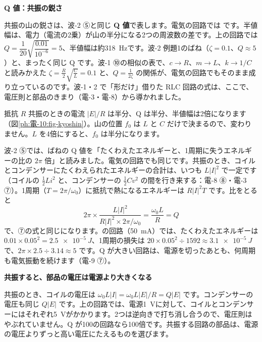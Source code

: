 \noindent\textbf{Q 値：共振の鋭さ}\par\nobreak
共振の山の鋭さは、波-2 ⑤と同じ \textbf{Q 値}で表します。電気の回路では
\label{ph:電-10:q}です。半値幅は、電力（電流の2乗）が山の半分になる2つの周波数の差です。上の回路では $Q=\dfrac{1}{20}\sqrt{\dfrac{0.01}{10^{-6}}}=5$、半値幅は約\qty{318}{Hz}です。波-2 例題1のばね（$\zeta=0.1$、$Q\approx5$）と、まったく同じ Q です。波-1 ⑩の相似の表で、$c\to R$、$m\to L$、$k\to1/C$ と読みかえた $\zeta=\tfrac{R}{2}\sqrt{\tfrac{C}{L}}=0.1$ と、$Q=\tfrac{1}{2\zeta}$ の関係が、電気の回路でもそのまま成り立っているのです。波-1・2 で「形だけ」借りた RLC 回路の式は、ここで、電圧則と部品のきまり（電-3・電-8）から導かれました。

\begin{phbaisuru}{抵抗 $R$}
共振のときの電流 $\lvert E\rvert/R$ は半分、Q は半分、半値幅は2倍になります（図\ref{ph:電-10:fig-kyoshin}）。山の位置 $f_0$ は $L$ と $C$ だけで決まるので、変わりません。$L$ を4倍にすると、$f_0$ は半分になります。
\end{phbaisuru}

\begin{motto}[4]
波-2 ⑤では、ばねの Q 値を「たくわえたエネルギーと、1周期に失うエネルギーの比の $2\pi$ 倍」と読みました。電気の回路でも同じです。共振のとき、コイルとコンデンサーにたくわえられたエネルギーの合計は、いつも $L\lvert I\rvert^2$ で一定です（コイルの $\tfrac12Li^2$ と、コンデンサーの $\tfrac12Cv^2$ の間を行き来する：電-8 ⑧・電-3 ⑦）。1周期（$T=2\pi/\omega_0$）に抵抗で熱になるエネルギーは $R\lvert I\rvert^2T$ です。比をとると
\[ 2\pi\times\frac{L\lvert I\rvert^2}{R\lvert I\rvert^2\times2\pi/\omega_0}=\frac{\omega_0L}{R}=Q \]
で、⑦の式と同じになります。の回路（\qty{50}{mA}）では、たくわえたエネルギーは $0.01\times0.05^2=\qty{2.5e-5}{J}$、1周期の損失は $20\times0.05^2\div1592\approx\qty{3.1e-5}{J}$ で、$2\pi\times2.5\div3.14\approx5$ です。Q が大きい回路は、電源を切ったあとも、何周期も電気振動を続けます（電-9 ⑦）。
\end{motto}

\noindent\textbf{共振すると、部品の電圧は電源より大きくなる}\par\nobreak
共振のとき、コイルの電圧は $\omega_0L\lvert I\rvert=\omega_0L\lvert E\rvert/R=Q\lvert E\rvert$ です。コンデンサーの電圧も同じ $Q\lvert E\rvert$ です。上の回路では、電源\qty{1}{V}に対して、コイルとコンデンサーにはそれぞれ\qty{5}{V}がかかります。2つは逆向きで打ち消し合うので、電圧則はやぶれていません。Q が100の回路なら100倍です。共振する回路の部品は、電源の電圧よりずっと高い電圧にたえるものを選びます。

